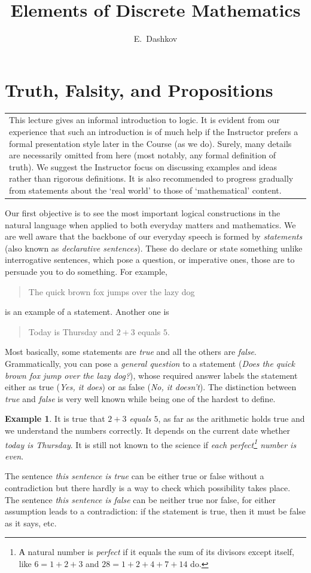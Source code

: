 \documentclass[12pt,notitlepage]{article}
\title{Elements of Discrete Mathematics}
\author{E.~Dashkov}
\theoremstyle{plain}
\theoremstyle{definition}
\newtheorem{exm}[thm]{Example}
\theoremstyle{plain}
\newcommand{\1}{\mathbf{1}}
\newcommand{\0}{\mathbf{0}}
\newcommand{\mcomm}[1]{
\medskip\noindent\begin{tabular}{| l}
\parbox{0.99\textwidth}{{\small
#1 }}\end{tabular}
\smallskip}
\begin{document}
\maketitle

\tableofcontents
\newpage

\section{Truth, Falsity, and Propositions}\label{sect:1}

\mcomm{This lecture gives an informal introduction to logic. It is evident from our experience that such an introduction is of much help if the Instructor prefers a formal presentation style later in the Course (as we do). Surely, many details are necessarily omitted from here (most notably, any formal definition of truth). We suggest the Instructor focus on
discussing examples and ideas rather than rigorous definitions. It is also recommended to progress gradually from statements about the `real world' to those of `mathematical' content.}

Our first objective is to see the most important logical constructions in the natural language when applied to both everyday matters and mathematics. We are well aware that the backbone of our everyday speech is formed by \emph{statements} (also known as \emph{declarative sentences}). These do declare or state something unlike interrogative sentences, which pose a question, or imperative ones, those are to persuade you to do something. For example,
\begin{quote}
The quick brown fox jumps over the lazy dog
\end{quote}
is an example of a statement. Another one is
\begin{quote}
Today is Thursday and $2 + 3$ equals $5$.
\end{quote}

Most basically, some statements are \emph{true} and all the others are \emph{false}. Grammatically, you can pose a \emph{general question} to a statement (\emph{Does the quick brown fox jump over the lazy dog?}), whose required answer labels the statement either as true (\emph{Yes, it does}) or as false (\emph{No, it doesn't}).  The distinction between \emph{true} and \emph{false} is very well known while being one of the hardest to define.
\begin{exm}
It is true that \emph{$2 + 3$ equals $5$}, as far as the arithmetic holds true and we understand the numbers correctly. It depends on the current date whether \emph{today is Thursday}. It is still not known to the science if \emph{each perfect\footnote{А natural number is \emph{perfect} if it equals the sum of its divisors except itself, like $6 = 1 + 2 + 3$ and $28 = 1 + 2 + 4 + 7 + 14$ do.} number is even}.

The sentence \emph{this sentence is true} can be either true or false without a contradiction but there hardly is a way to check which possibility takes place. The sentence \emph{this sentence is false} can be neither true nor false, for either assumption leads to a contradiction: if the statement is true, then it must be false as it says, etc.
\end{exm}
\end{document}
